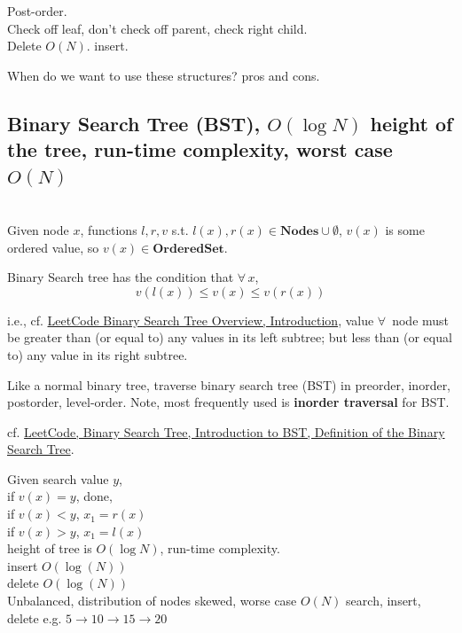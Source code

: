 \documentclass[10pt]{amsart}
\begin{document}
\begin{multicols*}{2}
Post-order. \\
Check off leaf, don't check off parent, check right child. \\

Delete $O(N)$.
insert.

When do we want to use these structures? pros and cons.

\subsection{Binary Search Tree (BST), $O(\log{N})$ height of the tree, run-time complexity, worst case $O(N)$}

\quad \\

Given node $x$, functions $l, r, v$ s.t. $l(x), r(x) \in \textbf{Nodes} \cup \emptyset$, $v(x)$ is some ordered value, so $v(x) \in \textbf{OrderedSet}$. 

Binary Search tree has the condition that $\forall \, x$, 
\[
v(l(x)) \leq v(x) \leq v(r(x))
\]

i.e., cf. \href{https://leetcode.com/explore/learn/card/introduction-to-data-structure-binary-search-tree/}{LeetCode Binary Search Tree Overview, Introduction}, value $\forall \, $ node must be greater than (or equal to) any values in its left subtree; but less than (or equal to) any value in its right subtree.

Like a normal binary tree, traverse binary search tree (BST) in preorder, inorder, postorder, level-order. Note, most frequently used is \textbf{inorder traversal} for BST. 

cf. \href{https://leetcode.com/explore/learn/card/introduction-to-data-structure-binary-search-tree/140/introduction-to-a-bst/1017/}{LeetCode, Binary Search Tree, Introduction to BST, Definition of the Binary Search Tree}.



Given search value $y$, \\
if $v(x) = y$, done, \\
if $v(x) < y$, $x_1 = r(x)$ \\
if $v(x) > y$, $x_1= l(x)$ \\

height of tree is $O(\log{N})$, run-time complexity. \\
insert $O(\log{(N)})$ \\
delete $O(\log{(N)})$ \\

Unbalanced, distribution of nodes skewed, worse case $O(N)$ search, insert, delete e.g. $5 \to 10 \to 15 \to 20$


\end{multicols*}
\end{document}
